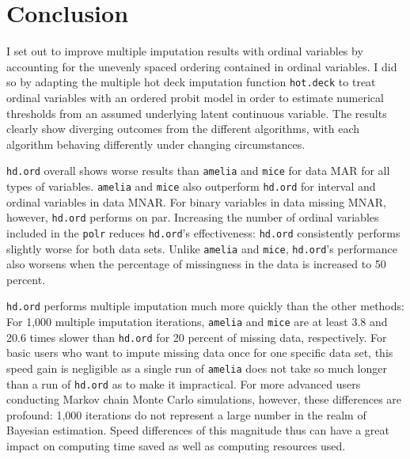 \documentclass[12pt,econ]{sources/authesis}
\begin{document}
\hypertarget{ordmiss-conclusion}{%
\section{Conclusion}\label{ordmiss-conclusion}}

I set out to improve multiple imputation results with ordinal variables by accounting for the unevenly spaced ordering contained in ordinal variables. I did so by adapting the multiple hot deck imputation function \texttt{hot.deck} to treat ordinal variables with an ordered probit model in order to estimate numerical thresholds from an assumed underlying latent continuous variable. The results clearly show diverging outcomes from the different algorithms, with each algorithm behaving differently under changing circumstances.

\texttt{hd.ord} overall shows worse results than \texttt{amelia} and \texttt{mice} for data MAR for all types of variables. \texttt{amelia} and \texttt{mice} also outperform \texttt{hd.ord} for interval and ordinal variables in data MNAR. For binary variables in data missing MNAR, however, \texttt{hd.ord} performs on par. Increasing the number of ordinal variables included in the \texttt{polr} reduces \texttt{hd.ord}'s effectiveness: \texttt{hd.ord} consistently performs slightly worse for both data sets. Unlike \texttt{amelia} and \texttt{mice}, \texttt{hd.ord}'s performance also worsens when the percentage of missingness in the data is increased to 50 percent.

\texttt{hd.ord} performs multiple imputation much more quickly than the other methods: For 1,000 multiple imputation iterations, \texttt{amelia} and \texttt{mice} are at least 3.8 and 20.6 times slower than \texttt{hd.ord} for 20 percent of missing data, respectively. For basic users who want to impute missing data once for one specific data set, this speed gain is negligible as a single run of \texttt{amelia} does not take so much longer than a run of \texttt{hd.ord} as to make it impractical. For more advanced users conducting Markov chain Monte Carlo simulations, however, these differences are profound: 1,000 iterations do not represent a large number in the realm of Bayesian estimation. Speed differences of this magnitude thus can have a great impact on computing time saved as well as computing resources used.
\end{document}
